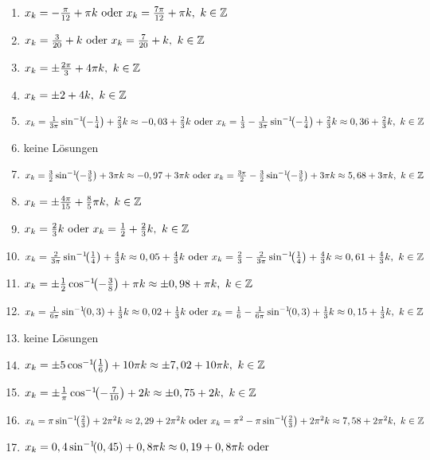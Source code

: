 \begin{Answer}[ref=sincosGleichungenAllgA1]
	\begin{enumerate}[label=\alph*)]
		\item \(x_k=-\frac{\pi}{12} +\pi k\text{ oder }x_k=\frac{7\pi}{12} +\pi k,\ k\in\mathbb{Z}\)
		\item \(x_k=\frac{3}{20} + k\text{ oder }x_k=\frac{7}{20} + k,\ k\in\mathbb{Z}\)
		\item \(x_k=\pm \frac{2\pi}{3} +4\pi k,\ k\in\Z\)
		\item \(x_k=\pm 2 +4 k,\ k\in\Z\)
		\item \(x_k=\frac{1}{3\pi}\arcsinn{-\frac{1}{4}} +\frac{2}{3} k\approx -0,03+\frac{2}{3} k\text{ oder }x_k=\frac{1}{3}-\frac{1}{3\pi}\arcsinn{-\frac{1}{4}} +\frac{2}{3} k\approx 0,36+\frac{2}{3} k,\ k\in\Z\)
		\item keine Lösungen
		\item \(x_k=\frac{3}{2}\arcsinn{-\frac{3}{5}} +3\pi k\approx -0,97+3\pi k\text{ oder }x_k=\frac{3\pi}{2}-\frac{3}{2}\arcsinn{-\frac{3}{5}} +3\pi k\approx 5,68+3\pi k,\ k\in\Z\)
		\item \(x_k=\pm \frac{4\pi}{15} +\frac{8}{5}\pi k,\ k\in\mathbb{Z}\)
		\item \(x_k=\frac{2}{3} k\text{ oder }x_k=\frac{1}{2} +\frac{2}{3} k,\ k\in\mathbb{Z}\)
		\item \(x_k=\frac{2}{3\pi}\arcsinn{\frac{1}{4}} +\frac{4}{3} k\approx 0,05+\frac{4}{3} k\text{ oder }x_k=\frac{2}{3}-\frac{2}{3\pi}\arcsinn{\frac{1}{4}} +\frac{4}{3} k\approx 0,61+\frac{4}{3} k,\ k\in\Z\)
		\item \(x_k=\pm \frac{1}{2}\arccoss{-\frac{3}{8}} +\pi k\approx\pm 0,98 +\pi k,\ k\in\Z\)
		\item \(x_k=\frac{1}{6\pi}\arcsinn{0,3} +\frac{1}{3} k\approx 0,02+\frac{1}{3} k\text{ oder }x_k=\frac{1}{6}-\frac{1}{6\pi}\arcsinn{0,3} +\frac{1}{3} k\approx 0,15+\frac{1}{3} k,\ k\in\Z\)
		\item keine Lösungen
		\item \(x_k=\pm 5\arccoss{\frac{1}{6}} +10\pi k\approx\pm 7,02 +10\pi k,\ k\in\Z\)
		\item \(x_k=\pm \frac{1}{\pi}\arccoss{-\frac{7}{10}} +2k\approx\pm 0,75 +2k,\ k\in\Z\)
		\item \(x_k=\pi\arcsinn{\frac{2}{3}} +2\pi^2 k\approx 2,29+2\pi^2 k\text{ oder }x_k=\pi^2-\pi\arcsinn{\frac{2}{3}} +2\pi^2 k\approx 7,58+2\pi^2 k,\ k\in\Z\)
		\item \(x_k=0,4\arcsinn{0,45} +0,8\pi k\approx 0,19+0,8\pi k\text{ oder }\)


\end{enumerate}
\end{Answer}
